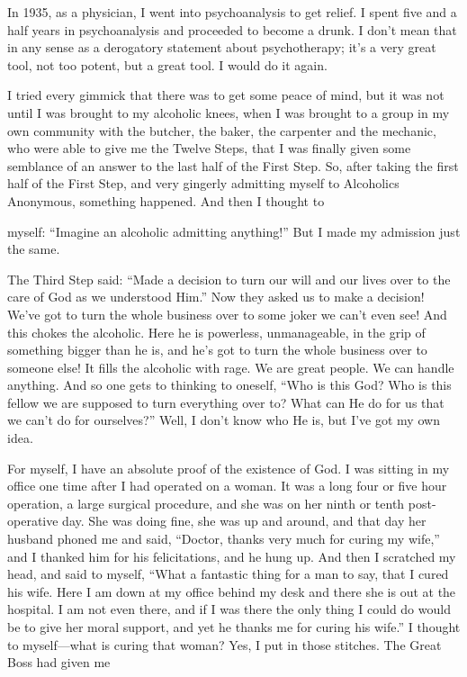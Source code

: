 In 1935, as a physician, I went into psychoanalysis to get relief. I spent five and a half years in psychoanalysis and proceeded to become a drunk. I don’t mean that in any sense as a derogatory statement about psychotherapy; it’s a very great tool, not too potent, but a great tool. I would do it again.

I tried every gimmick that there was to get some peace of mind, but it was not until I was brought to my alcoholic knees, when I was brought to a group in my own community with the butcher, the baker, the carpenter and the mechanic, who were able to give me the Twelve Steps, that I was finally given some semblance of an answer to the last half of the First Step. So, after taking the first half of the First Step, and very gingerly admitting myself to Alcoholics Anonymous, something happened. And then I thought to

myself: “Imagine an alcoholic admitting anything!” But I made my admission just the same.

The Third Step said: “Made a decision to turn our will and our lives over to the care of God as we understood Him.” Now they asked us to make a decision! We’ve got to turn the whole business over to some joker we can’t even see! And this chokes the alcoholic. Here he is powerless, unmanageable, in the grip of something bigger than he is, and he’s got to turn the whole business over to someone else! It fills the alcoholic with rage. We are great people. We can handle anything. And so one gets to thinking to oneself, “Who is this God? Who is this fellow we are supposed to turn everything over to? What can He do for us that we can’t do for ourselves?” Well, I don’t know who He is, but I’ve got my own idea.

For myself, I have an absolute proof of the existence of God. I was sitting in my office one time after I had operated on a woman. It was a long four or five hour operation, a large surgical procedure, and she was on her ninth or tenth post-operative day. She was doing fine, she was up and around, and that day her husband phoned me and said, “Doctor, thanks very much for curing my wife,” and I thanked him for his felicitations, and he hung up. And then I scratched my head, and said to myself, “What a fantastic thing for a man to say, that I cured his wife. Here I am down at my office behind my desk and there she is out at the hospital. I am not even there, and if I was there the only thing I could do would be to give her moral support, and yet he thanks me for curing his wife.” I thought to myself—what is curing that woman? Yes, I put in those stitches. The Great Boss had given me

